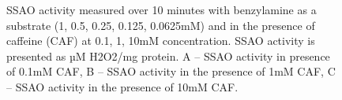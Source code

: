 \documentclass[
  letterpaper,
  DIV=11,
  numbers=noendperiod]{scrreprt}
\begin{document}
\begin{figure}[H]


\caption{\label{fig-ssao-activity-plot-caf}SSAO activity measured over
10 minutes with benzylamine as a substrate (1, 0.5, 0.25, 0.125,
0.0625mM) and in the presence of caffeine (CAF) at 0.1, 1, 10mM
concentration. SSAO activity is presented as µM H2O2/mg protein. A --
SSAO activity in presence of 0.1mM CAF, B -- SSAO activity in the
presence of 1mM CAF, C -- SSAO activity in the presence of 10mM CAF.}

\end{figure}%
\end{document}
